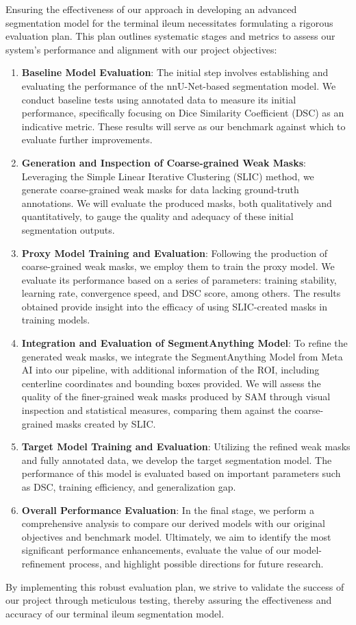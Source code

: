 Ensuring the effectiveness of our approach in developing an advanced segmentation model for the terminal ileum necessitates formulating a rigorous evaluation plan. This plan outlines systematic stages and metrics to assess our system's performance and alignment with our project objectives:

\begin{enumerate}
    \item \textbf{Baseline Model Evaluation}: The initial step involves establishing and evaluating the performance of the nnU-Net-based segmentation model. We conduct baseline tests using annotated data to measure its initial performance, specifically focusing on Dice Similarity Coefficient (DSC) as an indicative metric. These results will serve as our benchmark against which to evaluate further improvements.
    \item \textbf{Generation and Inspection of Coarse-grained Weak Masks}: Leveraging the Simple Linear Iterative Clustering (SLIC) method, we generate coarse-grained weak masks for data lacking ground-truth annotations. We will evaluate the produced masks, both qualitatively and quantitatively, to gauge the quality and adequacy of these initial segmentation outputs.
    \item \textbf{Proxy Model Training and Evaluation}: Following the production of coarse-grained weak masks, we employ them to train the proxy model. We evaluate its performance based on a series of parameters: training stability, learning rate, convergence speed, and DSC score, among others. The results obtained provide insight into the efficacy of using SLIC-created masks in training models.
    \item \textbf{Integration and Evaluation of SegmentAnything Model}: To refine the generated weak masks, we integrate the SegmentAnything Model from Meta AI into our pipeline, with additional information of the ROI, including centerline coordinates and bounding boxes provided. We will assess the quality of the finer-grained weak masks produced by SAM through visual inspection and statistical measures, comparing them against the coarse-grained masks created by SLIC.
    \item \textbf{Target Model Training and Evaluation}: Utilizing the refined weak masks and fully annotated data, we develop the target segmentation model. The performance of this model is evaluated based on important parameters such as DSC, training efficiency, and generalization gap.
    \item \textbf{Overall Performance Evaluation}: In the final stage, we perform a comprehensive analysis to compare our derived models with our original objectives and benchmark model. Ultimately, we aim to identify the most significant performance enhancements, evaluate the value of our model-refinement process, and highlight possible directions for future research.
\end{enumerate}

By implementing this robust evaluation plan, we strive to validate the success of our project through meticulous testing, thereby assuring the effectiveness and accuracy of our terminal ileum segmentation model.